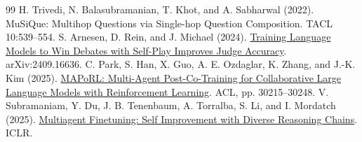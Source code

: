 \documentclass[11pt,letterpaper]{article}
\begin{document}
\begin{thebibliography}{99}
 H. Trivedi, N. Balasubramanian, T. Khot, and A. Sabharwal (2022). MuSiQue: Multihop Questions via Single-hop Question Composition. TACL 10:539--554.
 S. Arnesen, D. Rein, and J. Michael (2024). \href{https://arxiv.org/abs/2409.16636}{Training Language Models to Win Debates with Self-Play Improves Judge Accuracy}. arXiv:2409.16636.
 C. Park, S. Han, X. Guo, A. E. Ozdaglar, K. Zhang, and J.-K. Kim (2025). \href{https://aclanthology.org/2025.acl-long.1459}{MAPoRL: Multi-Agent Post-Co-Training for Collaborative Large Language Models with Reinforcement Learning}. ACL, pp. 30215--30248.
 V. Subramaniam, Y. Du, J. B. Tenenbaum, A. Torralba, S. Li, and I. Mordatch (2025). \href{https://proceedings.iclr.cc/paper_files/paper/2025/hash/1d50221b03ced7152d8750c9d1e66cba-Abstract-Conference.html}{Multiagent Finetuning: Self Improvement with Diverse Reasoning Chains}. ICLR.
\end{thebibliography}
\endgroup
\end{document}
